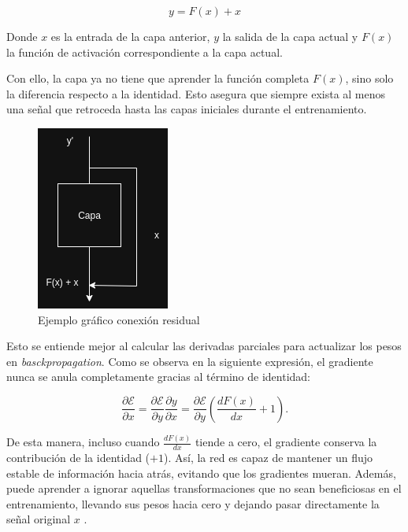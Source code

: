 \documentclass[11pt]{book}
\theoremstyle{plain}
\theoremstyle{definition}
\begin{document}
\[
y = F(x) + x
\]

Donde $x$ es la entrada de la capa anterior, $y$ la salida de la capa actual y $F(x)$ la función de activación correspondiente a la capa actual.

Con ello, la capa ya no tiene que aprender la función completa $F(x)$, sino solo la diferencia respecto a la identidad. Esto asegura que siempre exista al menos una señal que retroceda hasta las capas iniciales durante el entrenamiento.

\begin{figure}[h]
    \centering
    \includegraphics[width=0.5\linewidth]{img/ResNet.png}
    \caption{Ejemplo gráfico conexión residual}
    \label{fig:placeholder13}
\end{figure}

Esto se entiende mejor al calcular las derivadas parciales para actualizar los pesos en \textit{basckpropagation}. Como se observa en la siguiente expresión, el gradiente nunca se anula completamente gracias al término de identidad: 

\[
\frac{\partial \mathcal{E}}{\partial x}
= \frac{\partial \mathcal{E}}{\partial y}
    \frac{\partial y}{\partial x}
= \frac{\partial \mathcal{E}}{\partial y}
    \left( \frac{dF(x)}{dx} + 1 \right).
\]

De esta manera, incluso cuando $\frac{dF(x)}{dx}$ tiende a cero, el gradiente conserva la contribución de la identidad ($+1$). Así, la red es capaz de mantener un flujo estable de información hacia atrás, evitando que los gradientes mueran. Además, puede aprender a ignorar aquellas transformaciones que no sean beneficiosas en el entrenamiento, llevando sus pesos hacia cero y dejando pasar directamente la señal original $x$ \parencite{apxml_addnorm}. 
\end{document}
